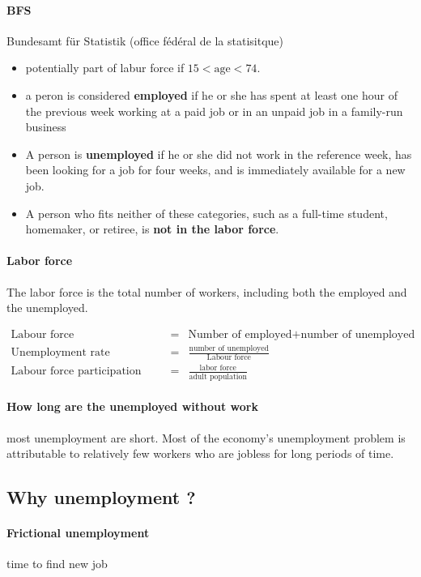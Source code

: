 \documentclass[a4paper,titlepage] {scrartcl}
\begin{document}
\paragraph{BFS} Bundesamt für Statistik (office fédéral de la statisitque)
\begin{itemize}
	\item potentially part of labur force if $15< \text{age} < 74 $.
	\item a peron is considered \textbf{employed} if he or she has spent at least one 
	hour of the previous week working at a paid job or in an unpaid job in a 
	family-run business
	\item A person is \textbf{unemployed} if he or she did not work in the reference week, 
	has been looking for a job for four weeks, and is immediately available 
	for a new job.
	\item A person who fits neither of these categories, such as a full-time 
	student, homemaker, or retiree, is \textbf{not in the labor force}.
\end{itemize}

\paragraph{Labor force}
The labor force is the total number of workers, including both the 
employed and the unemployed.

\begin{eqnarray*}
	\text{Labour force} &=& \text{Number of employed} + \text{number of unemployed}\\
	\text{Unemployment rate} &=&\frac{\text{number of unemployed}}{\text{Labour force}}\\
	\text{Labour force participation rate} &=&\frac{\text{labor force}}{\text{adult population}}
\end{eqnarray*}

\paragraph{How long are the unemployed without work}
most unemployment are short. Most of the economy's unemployment problem is attributable to relatively few workers who are jobless for long periods of time.

\subsection{Why unemployment ?}
\paragraph{Frictional unemployment} time to find new job
\end{document}
